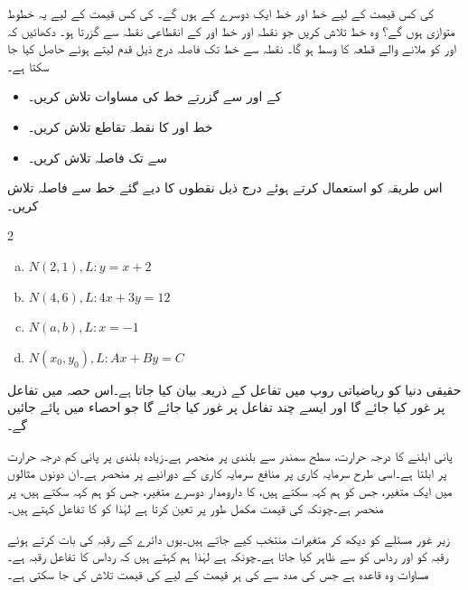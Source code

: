  کی کس قیمت کے لیے خط  اور خط  ایک دوسرے کے   ہوں گے۔ کی کس قیمت کے لیے یہ خطوط متوازی ہوں گے؟
وہ خط تلاش کریں جو نقطہ  اور خط  اور  کے انقطاعی نقطہ سے گزرتا ہو۔
دکھائیں کہ  اور  کو ملانے والے قطعہ کا وسط  ہو گا۔
\quad
نقطہ  سے خط  تک فاصلہ  درج ذیل قدم لیتے ہوئے حاصل کیا جا سکتا ہے۔
\begin{itemize}
\item
{} کے  اور  سے گزرتے خط  کی مساوات تلاش کریں۔
\item
خط  اور  کا نقطہ تقاطع  تلاش کریں۔
\item
{} سے  تک فاصلہ تلاش کریں۔
\end{itemize}
اس طریقہ کو استعمال کرتے ہوئے درج ذیل نقطوں کا دیے گئے خط سے فاصلہ تلاش کریں۔
\begin{multicols}{2}
\begin{enumerate}[a)]
\item
$N(2,1), L:y=x+2$
\item
$N(4,6), L:4x+3y=12$
\item
$N(a,b),L:x=-1$
\item
$N(x_0,y_0), L:Ax+By=C$
\end{enumerate}
\end{multicols}

حقیقی دنیا کو ریاضیاتی روپ میں تفاعل کے ذریعہ بیان کیا جاتا ہے۔اس حصہ میں تفاعل پر غور کیا جائے گا اور ایسے چند تفاعل پر غور کیا جائے گا جو احصاء میں پائے جائیں گے۔

 پانی ابلنے کا درجہ حرارت، سطح سمندر سے بلندی پر  منحصر ہے۔زیادہ بلندی پر پانی کم درجہ حرارت پر ابلتا ہے۔اسی طرح سرمایہ کاری پر منافع سرمایہ کاری کے دورانیے پر منحصر ہے۔ان دونوں مثالوں میں ایک متغیر، جس کو ہم  کہہ سکتے ہیں، کا دارومدار دوسرے متغیر، جس کو ہم  کہہ سکتے ہیں، پر منحصر ہے۔چونکہ  کی قیمت مکمل طور پر  تعین کرتا ہے لہٰذا  کو  کا تفاعل کہتے ہیں۔

زیر غور مسئلے کو دیکھ کر متغیرات منتخب کیے جاتے ہیں۔یوں دائرے کے رقبہ کی بات کرتے ہوئے رقبہ کو  اور رداس کو  سے ظاہر کیا جاتا ہے۔چونکہ  ہے لہٰذا ہم کہتے ہیں کہ رداس  کا  تفاعل رقبہ   ہے۔
مساوات  وہ قاعدہ ہے جس کی مدد سے  کی ہر قیمت  کے لیے  کی  قیمت  تلاش کی جا سکتی ہے۔ 

